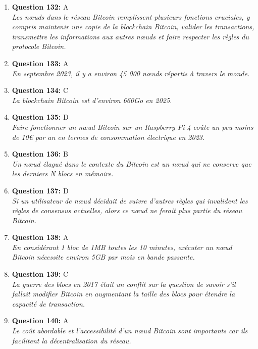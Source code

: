 \documentclass[12pt,a4paper]{article}
\begin{document}
\begin{enumerate}
\item \textbf{Question 132:} A
\\ \textit{Les nœuds dans le réseau Bitcoin remplissent plusieurs fonctions cruciales, y compris maintenir une copie de la blockchain Bitcoin, valider les transactions, transmettre les informations aux autres nœuds et faire respecter les règles du protocole Bitcoin.}

\item \textbf{Question 133:} A
\\ \textit{En septembre 2023, il y a environ 45 000 nœuds répartis à travers le monde.}

\item \textbf{Question 134:} C
\\ \textit{La blockchain Bitcoin est d'environ 660Go en 2025.}

\item \textbf{Question 135:} D
\\ \textit{Faire fonctionner un nœud Bitcoin sur un Raspberry Pi 4 coûte un peu moins de 10€ par an en termes de consommation électrique en 2023.}

\item \textbf{Question 136:} B
\\ \textit{Un nœud élagué dans le contexte du Bitcoin est un nœud qui ne conserve que les derniers N blocs en mémoire.}

\item \textbf{Question 137:} D
\\ \textit{Si un utilisateur de nœud décidait de suivre d'autres règles qui invalident les règles de consensus actuelles, alors ce nœud ne ferait plus partie du réseau Bitcoin.}

\item \textbf{Question 138:} A
\\ \textit{En considérant 1 bloc de 1MB toutes les 10 minutes, exécuter un nœud Bitcoin nécessite environ 5GB par mois en bande passante.}

\item \textbf{Question 139:} C
\\ \textit{La guerre des blocs en 2017 était un conflit sur la question de savoir s'il fallait modifier Bitcoin en augmentant la taille des blocs pour étendre la capacité de transaction.}

\item \textbf{Question 140:} A
\\ \textit{Le coût abordable et l'accessibilité d'un nœud Bitcoin sont importants car ils facilitent la décentralisation du réseau.}


\end{enumerate}
\end{document}
